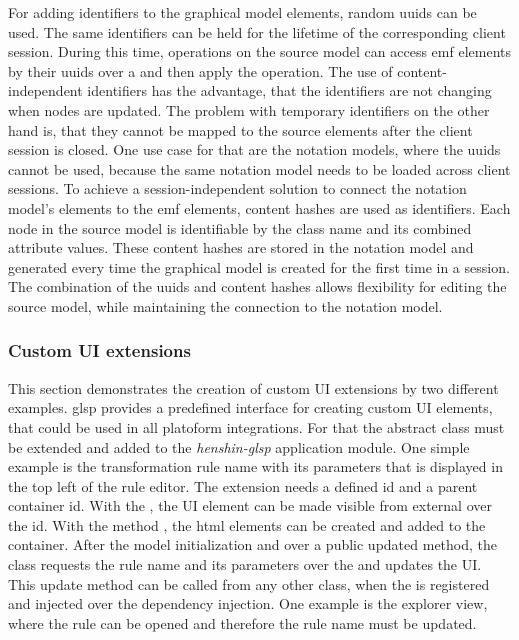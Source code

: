   For adding identifiers to the graphical model elements, random \acp{uuid} can be used. The same identifiers can be held for the lifetime of the corresponding client session. During this time, operations on the source model can access \ac{emf} elements by their \acp{uuid} over a  and then apply the operation. The use of content-independent identifiers has the advantage, that the identifiers are not changing when nodes are updated. The problem with temporary identifiers on the other hand is, that they cannot be mapped to the source elements after the client session is closed. One use case for that are the notation models, where the \acp{uuid} cannot be used, because the same notation model needs to be loaded across client sessions. To achieve a session-independent solution to connect the notation model's elements to the \ac{emf} elements, content hashes are used as identifiers. Each node in the source model is identifiable by the class name and its combined attribute values. These content hashes are stored in the notation model and generated every time the graphical model is created for the first time in a session. The combination of the \acp{uuid} and content hashes allows flexibility for editing the source model, while maintaining the connection to the notation model.

  \subsubsection{Custom UI extensions}
  \label{subsec:custom-ui-extensions}

  This section demonstrates the creation of custom UI extensions by two different examples. \ac{glsp} provides a predefined interface for creating custom UI elements, that could be used in all platoform integrations. For that the abstract class  must be extended and added to the \textit{henshin-glsp} application module. One simple example is the transformation rule name with its parameters that is displayed in the top left of the rule editor. The extension needs a defined id and a parent container id. With the , the UI element can be made visible from external over the id. With the method , the \acs{html} elements can be created and added to the container. After the model initialization and over a public updated method, the class requests the rule name and its parameters over the  and updates the UI. This update method can be called from any other class, when the  is registered and injected over the dependency injection. One example is the explorer view, where the rule can be opened and therefore the rule name must be updated.
  
